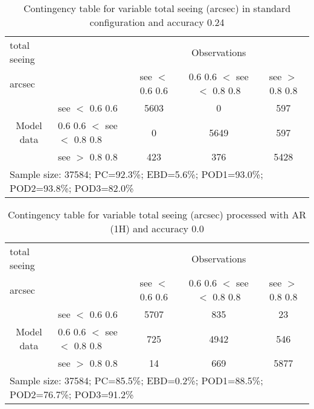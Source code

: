 \documentclass[11pt,english]{article}
\begin{document}
\begin{table}[]
\begin{center}
\begin{tabular}{llccc}
\hline
{total seeing}                                       &                                                    & \multicolumn{3}{c}{Observations}                 \\
{arcsec}                                       &                             & see $<$ 0.6
0.6   & 0.6
0.6 $<$ see $<$ 0.8
0.8 & see $>$ 0.8
0.8 \\
\hline
\multicolumn{1}{c}{\multirow{3}{*}{Model data}}  & see $<$ 0.6
0.6             & 5603                & 0                       & 597              \\
                                                 & 0.6
0.6  $<$ see $<$ 0.8
0.8 & 0                & 5649                       & 597              \\
                                                 & see $>$ 0.8
0.8             & 423                & 376                       & 5428              \\
\hline
\multicolumn{5}{l}{Sample size: 37584; PC=92.3\%; EBD=5.6\%; POD1=93.0\%; POD2=93.8\%; POD3=82.0\%}
\end{tabular}
\end{center}
\caption{Contingency table for variable total seeing (arcsec) in standard configuration and accuracy 0.24}
\label{tab:contingencyseeBEF}
\end{table}
\begin{table}[]
\begin{center}
\begin{tabular}{llccc}
\hline
{total seeing}                                       &                                                    & \multicolumn{3}{c}{Observations}                 \\
{arcsec}                                       &                             & see $<$ 0.6
0.6   & 0.6
0.6 $<$ see $<$ 0.8
0.8 & see $>$ 0.8
0.8 \\
\hline
\multicolumn{1}{c}{\multirow{3}{*}{Model data}}  & see $<$ 0.6
0.6             & 5707                & 835                       & 23              \\
                                                 & 0.6
0.6  $<$ see $<$ 0.8
0.8 & 725                & 4942                       & 546              \\
                                                 & see $>$ 0.8
0.8             & 14                & 669                       & 5877              \\
\hline
\multicolumn{5}{l}{Sample size: 37584; PC=85.5\%; EBD=0.2\%; POD1=88.5\%; POD2=76.7\%; POD3=91.2\%}
\end{tabular}
\end{center}
\caption{Contingency table for variable total seeing (arcsec) processed with AR (1H) and accuracy 0.0}
\label{tab:contingencyseeAFT}
\end{table}
\end{document}
